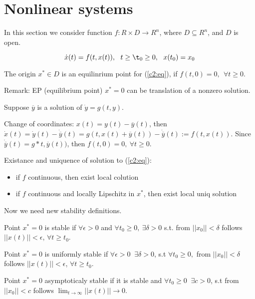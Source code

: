 \section{Nonlinear systems}

In this section we consider function $f:R\times D\rightarrow R^n$,
where $D \subseteq R^n$, and $D$ is open.

\begin{equation}\label{c2:eq}
 \dot x(t)=f(t,x(t)), \ \ t\ge \t_0\ge 0,\ \ x(t_0)=x_0
\end{equation} 

The origin $x^* \in D$ is an equilinrium point for (\ref{c2:eq}),
if $f(t,0)=0, \ \ \forall t \ge 0$.

Remark: EP (equilibrium point) $x^*=0$ can be translation of a nonzero
solution.

Suppose $\overline{y}$ is a solution of $\dot y = g(t, y)$.

Change of coordinates: $x(t)=y(t)-\overline{y}(t)$, then
$\dot x(t) = \dot y(t)-\dot\overline{y}(t)=
g(t, x(t)+\overline{y}(t)) - \dot\overline{y}(t):=f(t,x(t))$.
Since $\dot\overline{y}(t)=g*t,\overline{y}(t))$, then
$f(t,0)=0,\ \forall t \ge 0$.

Existance and uniquence of solution to (\ref{c2:eq}):
\begin{itemize}
 \item if $f$ continuous, then exist local colution
 \item if $f$ continuous and locally Lipschitz in $x^*$, then
 	exist local uniq solution 
\end{itemize}


Now we need new stability definitions.

 Point $x^*=0$ is stable if $\forall \epsilon > 0$ and 
 $\forall t_0 \ge 0,\ \exists \delta>0$ s.t. from $||x_0||<\delta$
 follows $||x(t)|| < \epsilon$, $\forall t  \ge t_0$.

 Point $x^*=0$ is uniformly stable if $\forall \epsilon > 0\ $  
 $\exists \delta>0$, s.t $\forall t_0 \ge 0,$ from $||x_0||<\delta$
 follows $||x(t)|| < \epsilon$, $\forall t  \ge t_0$.

 Point $x^*=0$ asymptoticaly stable if it is stable and $\forall t_0 \ge 0\ $  
 $\exists c>0$, s.t from $||x_0||<c$
 follows $\lim_{t\to \infty} ||x(t)|| \to 0$.

